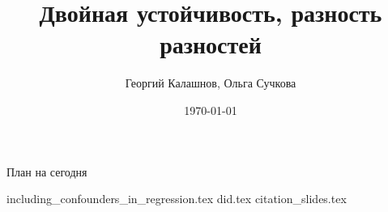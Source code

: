 \title{Двойная устойчивость, разность разностей}
\author[Георгий Калашнов, Ольга Сучкова]{Георгий Калашнов, Ольга Сучкова}
\date{\today}



\begin{frame}
  \titlepage
  
\end{frame}


\begin{frame}{План на сегодня} 
\tableofcontents
\end{frame}

{including_confounders_in_regression.tex}
{did.tex}
{citation_slides.tex}



